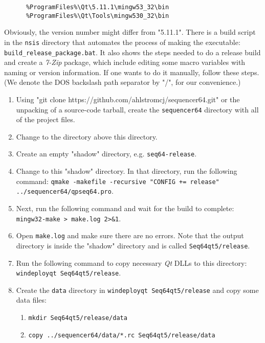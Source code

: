    \begin{verbatim}
      %ProgramFiles%\Qt\5.11.1\mingw53_32\bin
      %ProgramFiles%\Qt\Tools\mingw530_32\bin
   \end{verbatim}

   Obviously, the version number might differ from "5.11.1".
   There is a build script in the \texttt{nsis} directory that
   automates the process of making the executable:
   \texttt{build\_release\_package.bat}.
   It also shows the steps needed to do a release build and create a
   \textsl{7-Zip} package, which include editing some macro variables with
   naming or version information.  If one wants to do it manually,
   follow these steps.  (We denote the DOS backslash path separator
   by "/", for our convenience.)

   \begin{enumerate}
      \item Using
         "git clone https://github.com/ahlstromcj/sequencer64.git"
         or the unpacking of a source-code tarball,
         create the \texttt{sequencer64} directory with all
         of the project files.
      \item Change to the directory above this directory.
      \item Create an empty "shadow" directory, e.g. \texttt{seq64-release}.
      \item Change to this "shadow" directory.  In that directory, run the
         following command:
         \texttt{qmake -makefile -recursive "CONFIG += release"
            ../sequencer64/qpseq64.pro}.
      \item Next, run the following command and wait for the build to
         complete:
         \texttt{mingw32-make > make.log 2>\&1}.
      \item Open \texttt{make.log} and make sure there are no errors.
         Note that the output directory is inside the "shadow" directory and
         is called \texttt{Seq64qt5/release}.
      \item Run the following command to copy necessary \textsl{Qt} DLLs to
         this directory: \linebreak
         \texttt{windeployqt Seq64qt5/release}.
      \item Create the \texttt{data} directory in
         \texttt{windeployqt Seq64qt5/release} and copy some data files:
         \begin{enumerate}
            \item \texttt{mkdir Seq64qt5/release/data}
            \item \texttt{copy ../sequencer64/data/*.rc Seq64qt5/release/data}

\end{enumerate}
\end{enumerate}

